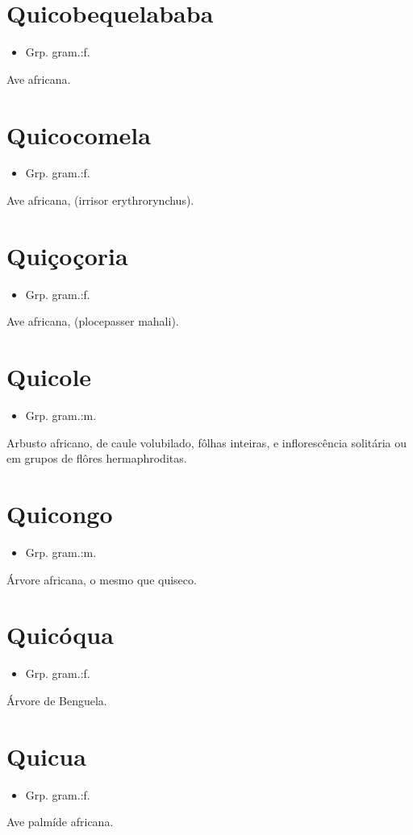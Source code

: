 \section{Quicobequelababa}
\begin{itemize}
\item {Grp. gram.:f.}
\end{itemize}
Ave africana.
\section{Quicocomela}
\begin{itemize}
\item {Grp. gram.:f.}
\end{itemize}
Ave africana, (\textunderscore irrisor erythrorynchus\textunderscore ).
\section{Quiçoçoria}
\begin{itemize}
\item {Grp. gram.:f.}
\end{itemize}
Ave africana, (\textunderscore plocepasser mahali\textunderscore ).
\section{Quicole}
\begin{itemize}
\item {Grp. gram.:m.}
\end{itemize}
Arbusto africano, de caule volubilado, fôlhas inteiras, e inflorescência solitária ou em grupos de flôres hermaphroditas.
\section{Quicongo}
\begin{itemize}
\item {Grp. gram.:m.}
\end{itemize}
Árvore africana, o mesmo que \textunderscore quiseco\textunderscore .
\section{Quicóqua}
\begin{itemize}
\item {Grp. gram.:f.}
\end{itemize}
Árvore de Benguela.
\section{Quicua}
\begin{itemize}
\item {Grp. gram.:f.}
\end{itemize}
Ave palmíde africana.

